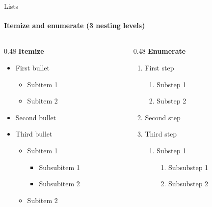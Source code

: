 \documentclass[sans,numeric,titlesplit]{qslides}
\begin{document}
\begin{frame}{Lists}
  \framesubtitle{Itemize and enumerate (3 nesting levels)}
  \begin{columns}[onlytextwidth,T]
    \begin{column}{0.48\linewidth}
      \textbf{Itemize}
      \begin{itemize}
        \item First bullet
          \begin{itemize}
            \item Subitem 1
            \item Subitem 2
          \end{itemize}
        \item Second bullet
        \item Third bullet
          \begin{itemize}
            \item Subitem 1
              \begin{itemize}
                \item Subsubitem 1
                \item Subsubitem 2
              \end{itemize}
            \item Subitem 2
          \end{itemize}
      \end{itemize}
    \end{column}
    \begin{column}{0.48\linewidth}
      \textbf{Enumerate}
      \begin{enumerate}
        \item First step
          \begin{enumerate}
            \item Substep 1
            \item Substep 2
          \end{enumerate}
        \item Second step
        \item Third step
          \begin{enumerate}
            \item Substep 1
              \begin{enumerate}
                \item Subsubstep 1
                \item Subsubstep 2
              \end{enumerate}
          \end{enumerate}
      \end{enumerate}
    \end{column}
  \end{columns}
\end{frame}
\end{document}
